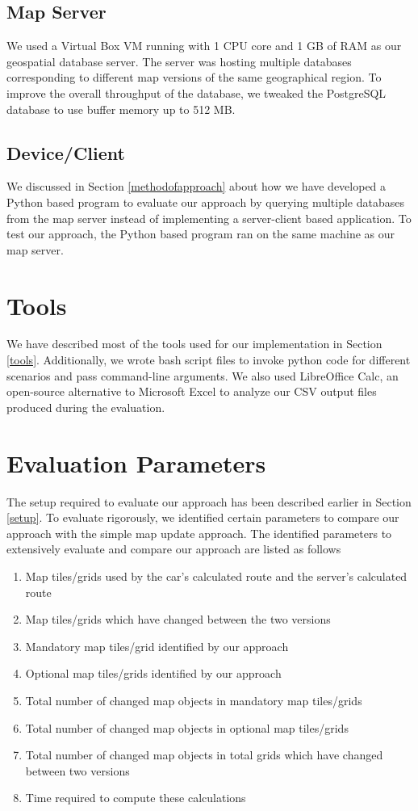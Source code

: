 \subsection{Map Server}
We used a Virtual Box VM running with 1 CPU core and 1 GB of RAM as our geospatial database server. The server was hosting multiple databases corresponding to different map versions of the same geographical region. To improve the overall throughput of the database, we tweaked the PostgreSQL database to use buffer memory up to 512 MB. 
\subsection{Device/Client}
We discussed in Section \ref{methodofapproach} about how we have developed a Python based program to evaluate our approach by querying multiple databases from the map server instead of implementing a server-client based application. To test our approach, the Python based program ran on the same machine as our map server. 
\section{Tools}
We have described most of the tools used for our implementation in Section \ref{tools}. Additionally, we wrote bash script files to invoke python code for different scenarios and pass command-line arguments. We also used LibreOffice Calc, an open-source alternative to Microsoft Excel to analyze our CSV output files produced during the evaluation. 
\section{Evaluation Parameters}\label{evaluationParameters}
The setup required to evaluate our approach has been described earlier in Section \ref{setup}. To evaluate rigorously, we identified certain parameters to compare our approach with the simple map update approach. The identified parameters to extensively evaluate and compare our approach are listed as follows
\begin{enumerate}
\item Map tiles/grids used by the car's calculated route and the server's calculated route
\item Map tiles/grids which have changed between the two versions
\item Mandatory map tiles/grid identified by our approach
\item Optional map tiles/grids identified by our approach
\item Total number of changed map objects in mandatory map tiles/grids
\item Total number of changed map objects in optional map tiles/grids
\item Total number of changed map objects in total grids which have changed between two versions
\item Time required to compute these calculations
\end{enumerate}


